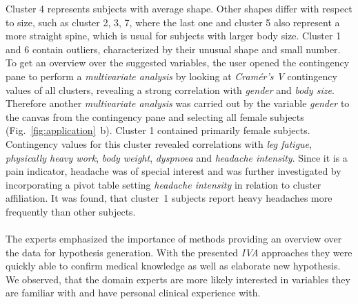 \documentclass[journal]{style/vgtc} 			          %
\newcommand{\add}[1]{\textcolor{blue}{\uline{#1}}}
\newcommand{\com}[1]{\textcolor{orange}{\uline{#1}}}
\begin{document}
Cluster 4 represents subjects with average shape.
%
Other shapes differ with respect to size, such as cluster 2, 3, 7, where the last one and cluster 5 also represent a more straight spine, which is usual for subjects with larger body size.
%
Cluster 1 and 6 contain outliers, characterized by their unusual shape and small number.
%
%
To get an overview over the suggested variables, the user opened the contingency pane to perform a \emph{multivariate analysis} by looking at \emph{Cram\'{e}r's V} contingency values of all clusters, revealing a strong correlation with \emph{gender} and \emph{body size}.
%
Therefore another \emph{multivariate analysis} was carried out by the variable \emph{gender} to the canvas from the contingency pane and selecting all female subjects (Fig.~\ref{fig:application}~b).
%
Cluster 1 contained primarily female subjects.
%
Contingency values for this cluster revealed correlations with \emph{leg fatigue}, \emph{physically heavy work}, \emph{body weight}, \emph{dyspnoea} and \emph{headache intensity}.
%
%
Since it is a pain indicator, headache was of special interest and was further investigated by incorporating a pivot table setting \emph{headache intensity} in relation to cluster affiliation.
%
It was found, that cluster~1 subjects report heavy headaches more frequently than other subjects.
%
%
%
%
\\\\
The experts emphasized the importance of methods providing an overview over the data for hypothesis generation.
%
With the presented \emph{IVA} approaches they were quickly able to confirm medical knowledge as well as elaborate new hypothesis.
%
We observed, that the domain experts are more likely interested in variables they are familiar with and have personal clinical experience with.
\end{document}
